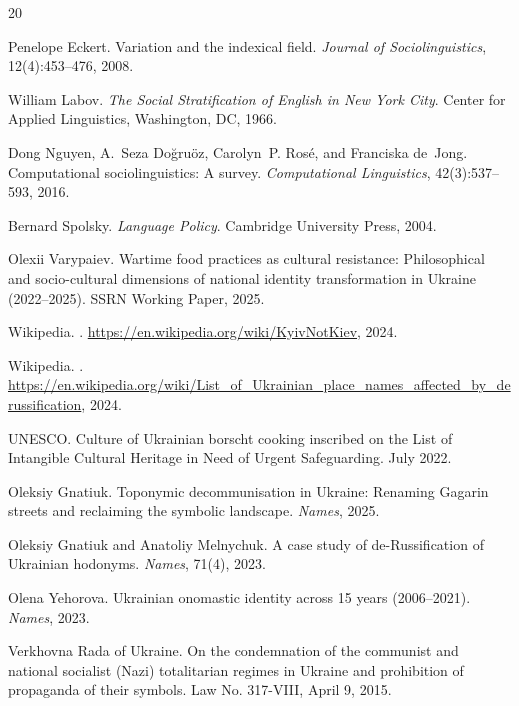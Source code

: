 \documentclass{article}
\begin{document}
\begin{thebibliography}{20}

Penelope Eckert.
\newblock Variation and the indexical field.
\newblock \textit{Journal of Sociolinguistics}, 12(4):453--476, 2008.

William Labov.
\newblock \textit{The Social Stratification of English in New York City}.
\newblock Center for Applied Linguistics, Washington, DC, 1966.

Dong Nguyen, A.~Seza Do\u{g}ru\"oz, Carolyn~P. Ros\'e, and Franciska de~Jong.
\newblock Computational sociolinguistics: A survey.
\newblock \textit{Computational Linguistics}, 42(3):537--593, 2016.

Bernard Spolsky.
\newblock \textit{Language Policy}.
\newblock Cambridge University Press, 2004.

Olexii Varypaiev.
\newblock Wartime food practices as cultural resistance: Philosophical and socio-cultural dimensions of national identity transformation in Ukraine (2022--2025).
\newblock SSRN Working Paper, 2025.

Wikipedia.
.
\newblock \url{https://en.wikipedia.org/wiki/KyivNotKiev}, 2024.

Wikipedia.
.
\newblock \url{https://en.wikipedia.org/wiki/List_of_Ukrainian_place_names_affected_by_derussification}, 2024.

UNESCO.
\newblock Culture of Ukrainian borscht cooking inscribed on the List of Intangible Cultural Heritage in Need of Urgent Safeguarding.
\newblock July 2022.

Oleksiy Gnatiuk.
\newblock Toponymic decommunisation in Ukraine: Renaming Gagarin streets and reclaiming the symbolic landscape.
\newblock \textit{Names}, 2025.

Oleksiy Gnatiuk and Anatoliy Melnychuk.
\newblock A case study of de-Russification of Ukrainian hodonyms.
\newblock \textit{Names}, 71(4), 2023.

Olena Yehorova.
\newblock Ukrainian onomastic identity across 15 years (2006--2021).
\newblock \textit{Names}, 2023.

Verkhovna Rada of Ukraine.
\newblock On the condemnation of the communist and national socialist (Nazi) totalitarian regimes in Ukraine and prohibition of propaganda of their symbols.
\newblock Law No. 317-VIII, April 9, 2015.

\end{thebibliography}
\end{document}
